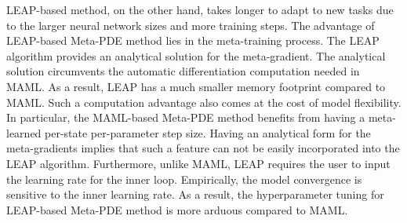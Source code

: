 LEAP-based method, on the other hand, takes longer to adapt to new tasks due to the larger neural network sizes and more training steps. The advantage of LEAP-based Meta-PDE method lies in the meta-training process. The LEAP algorithm provides an analytical solution for the meta-gradient. The analytical solution circumvents the automatic differentiation computation needed in MAML. As a result, LEAP has a much smaller memory footprint compared to MAML. Such a computation advantage also comes at the cost of model flexibility. In particular, the MAML-based Meta-PDE method benefits from having a meta-learned per-state per-parameter step size. Having an analytical form for the meta-gradients implies that such a feature can not be easily incorporated into the LEAP algorithm. Furthermore, unlike MAML, LEAP requires the user to input the learning rate for the inner loop. Empirically, the model convergence is sensitive to the inner learning rate. As a result, the hyperparameter tuning for LEAP-based Meta-PDE method is more arduous compared to MAML. 

